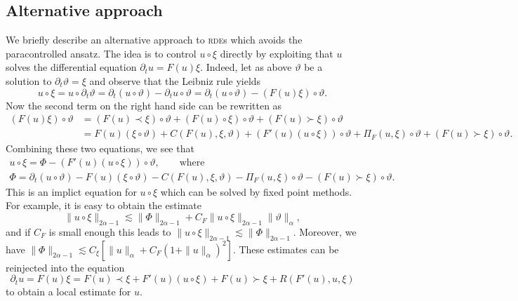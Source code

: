 \documentclass[11pt,a4paper]{article}
\theoremstyle{remark}
\begin{document}
\subsection{Alternative approach}

We briefly describe an alternative approach to \textsc{rde}s which avoids the
paracontrolled ansatz. The idea is to control $u \circ   \xi$ directly by
exploiting that $u$ solves the differential equation $\partial_{t} u=F ( u ) \xi$. Indeed, let as above $\vartheta$ be a solution to $\partial_{t} \vartheta = \xi$ and observe that the Leibniz rule yields
\[
   u \circ   \xi =u \circ   \partial_{t} \vartheta = \partial_{t} ( u \circ  \vartheta ) - \partial_{t} u \circ \vartheta = \partial_{t} ( u \circ   \vartheta ) - ( F ( u ) \xi ) \circ   \vartheta.
\]
Now the second term on the right hand side can be rewritten as
\begin{align*}
   ( F ( u ) \xi ) \circ   \vartheta & = ( F ( u ) \prec \xi ) \circ   \vartheta + ( F ( u ) \circ \xi ) \circ   \vartheta + ( F ( u ) \succ \xi ) \circ  \vartheta \\
   & =F ( u ) ( \xi \circ   \vartheta ) +C ( F ( u ) , \xi , \vartheta ) + ( F'( u ) ( u \circ   \xi ) ) \circ   \vartheta + \Pi_{F} ( u, \xi ) \circ  \vartheta + ( F ( u ) \succ \xi ) \circ   \vartheta.
\end{align*}
Combining these two equations, we see that
\begin{gather*}
   u \circ   \xi = \Phi - ( F' ( u ) ( u \circ   \xi ) ) \circ   \vartheta , \qquad \text{where} \\
   \Phi = \partial_{t} ( u \circ   \vartheta ) -F ( u ) ( \xi \circ \vartheta ) -C ( F ( u ) , \xi , \vartheta ) - \Pi_{F} ( u, \xi ) \circ \vartheta - ( F ( u ) \succ \xi ) \circ   \vartheta.
\end{gather*}
This is an implict equation for $u \circ   \xi$ which can be solved by fixed point methods. For example, it is easy to obtain the estimate
\[
   \| u \circ   \xi \|_{2 \alpha -1} \lesssim \| \Phi \|_{2 \alpha -1} +C_{F} \| u \circ   \xi \|_{2 \alpha -1} \| \vartheta \|_{\alpha},
\]
and if $C_{F}$ is small enough this leads to $\| u \circ   \xi \|_{2 \alpha -1} \lesssim \| \Phi \|_{2 \alpha -1}$. Moreover, we have $\| \Phi \|_{2 \alpha -1} \lesssim C_{\xi} [ \| u \|_{\alpha} +C_{F} ( 1+ \| u \|_{\alpha} )^{2} ]$. These estimates can be
reinjected into the equation
\[
   \partial_{t} u=F ( u ) \xi =F ( u ) \prec \xi +F' ( u ) ( u \circ   \xi ) +F ( u ) \succ \xi +R ( F' ( u ) ,u, \xi )
\]
to obtain a local estimate for $u$.
\end{document}
